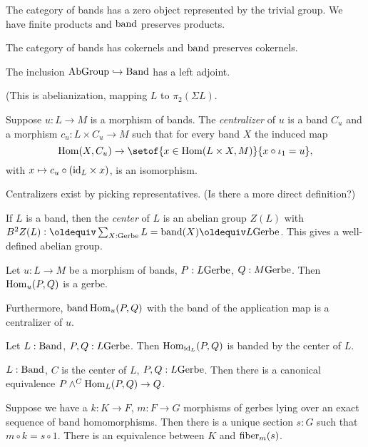 The category of bands has a zero object represented by the trivial
group. We have finite products and $\operatorname{band}$ preserves products.

\begin{lemma}
  The category of bands has cokernels and $\operatorname{band}$ preserves cokernels.
\end{lemma}
\begin{lemma}
  The inclusion $\mathord{\mathrm{AbGroup}} \hookrightarrow \mathord{\mathrm{Band}}$ has a left adjoint.
\end{lemma}
(This is abelianization, mapping $L$ to $\pi_2(\Sigma L)$.

\begin{definition}
  Suppose $u : L \to M$ is a morphism of bands. The \emph{centralizer}
  of $u$ is a band $C_u$ and a morphism $c_u : L \times C_u \to M$
  such that for every band $X$ the induced map
  \[
    \Hom(X,C_u) \to \setof{x \in \Hom(L \times X,
      M)}{x\circ\iota_1=u},
  \]
  with $x \mapsto c_u \circ (\mathord{\mathrm{id}}_L\times x)$, is an isomorphism.
\end{definition}
Centralizers exist by picking representatives. (Is there a more direct
definition?)

If $L$ is a band, then the \emph{center} of $L$ is an abelian group
$Z(L)$ with $B^2Z(L) \defeq \sum_{X : \Gerbe} L=\band(X) \jdeq
L\Gerbe$. This gives a well-defined abelian group.

\begin{theorem}
  Let $u : L\to M$ be a morphism of bands, $P:L\mathord{\mathrm{Gerbe}}$, $Q:M\mathord{\mathrm{Gerbe}}$.
  Then $\mathrm{Hom}_u(P,Q)$ is a gerbe.

  Furthermore, $\operatorname{band}\mathrm{Hom}_u(P,Q)$ with the band of the application map
  is a centralizer of $u$.
\end{theorem}
\begin{lemma}
  Let $L:\mathord{\mathrm{Band}}$, $P,Q:L\mathord{\mathrm{Gerbe}}$. Then $\mathrm{Hom}_{\mathord{\mathrm{id}}_L}(P,Q)$ is banded by
  the center of $L$.
\end{lemma}

\begin{lemma}
  $L:\mathord{\mathrm{Band}}$, $C$ is the center of $L$, $P,Q:L\mathord{\mathrm{Gerbe}}$. Then there is a
  canonical equivalence $P \wedge^C \mathrm{Hom}_L(P,Q) \to Q$.
\end{lemma}

\begin{lemma}
  Suppose we have a $k : K\to F$, $m:F\to G$ morphisms of gerbes lying
  over an exact sequence of band homomorphisms. Then there is a unique
  section $s : G$ such that $m\circ k=s\circ 1$. There is an
  equivalence between $K$ and $\operatorname{fiber}_m(s)$.
\end{lemma}

